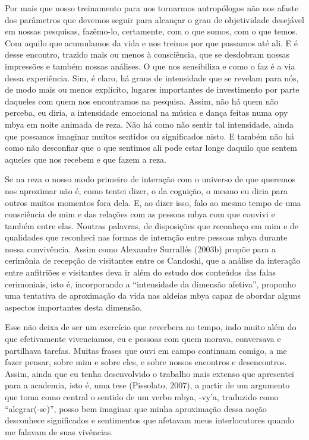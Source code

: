 Por mais que nosso treinamento para nos tornarmos antropólogos não nos
afaste dos parâmetros que devemos seguir para alcançar o grau de
objetividade desejável em nossas pesquisas, fazêmo-lo, certamente, com
o que somos, com o que temos. Com aquilo que acumulamos da vida e nos
treinos por que passamos até ali. E é desse encontro, trazido mais ou
menos à consciência, que se desdobram nossas impressões e também nossas
análises. O que nos sensibiliza e como o faz é a via dessa experiência.
Sim, é claro, há graus de intensidade que se revelam para nós, de modo
mais ou menos explícito, lugares importantes de investimento por parte
daqueles com quem nos encontramos na pesquisa. Assim, não há quem não
perceba, eu diria, a intensidade emocional na música e dança feitas
numa opy mbya em noite animada de reza. Não há como não sentir tal
intensidade, ainda que possamos imaginar muitos sentidos ou
significados nisto. E também não há como não desconfiar que o que
sentimos ali pode estar longe daquilo que sentem aqueles que nos
recebem e que fazem a reza.

Se na reza o nosso modo primeiro de interação com o universo de que
queremos nos aproximar não é, como tentei dizer, o da cognição, o mesmo
eu diria para outros muitos momentos fora dela. E, ao dizer isso, falo
ao mesmo tempo de uma consciência de mim e das relações com as pessoas
mbya com que convivi e também entre elas. Noutras palavras, de
disposições que reconheço em mim e de qualidades que reconheci nas
formas de interação entre pessoas mbya durante nossa convivência. Assim
como Alexandre Surrallés (2003b) propõe para a cerimônia de recepção de
visitantes entre os Candoshi, que a análise da interação entre
anfitriões e visitantes deva ir além do estudo dos conteúdos das falas
cerimoniais, isto é, incorporando a ``intensidade da dimensão afetiva'',
proponho uma tentativa de aproximação da vida nas aldeias mbya capaz de
abordar alguns aspectos importantes desta dimensão.

Esse não deixa de ser um exercício que reverbera no tempo, indo muito
além do que efetivamente vivenciamos, eu e pessoas com quem morava,
conversava e partilhava tarefas. Muitas frases que ouvi em campo
continuam comigo, a me fazer pensar, sobre mim e sobre eles, e sobre
nossos encontros e desencontros. Assim, ainda que eu tenha desenvolvido
o trabalho mais extenso que apresentei para a academia, isto é, uma
tese (Pissolato, 2007), a partir de um argumento que toma como central
o sentido de um verbo mbya, -vy’a, traduzido como ``alegrar(-se)'', posso
bem imaginar que minha aproximação dessa noção desconhece significados
e sentimentos que afetavam meus interlocutores quando me falavam de
suas vivências.

